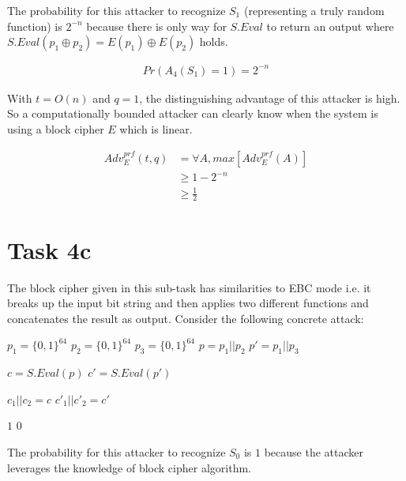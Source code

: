 \documentclass{article}
\begin{document}
    The probability for this attacker to recognize $S_1$ (representing a truly random function) is $2^{-n}$ because there is only way for $S.Eval$ to return an output where $S.Eval(p_1 \oplus p_2) = E(p_1) \oplus E(p_2)$ holds.

    \begin{align*}
        Pr(A_4(S_1) = 1) = 2^{-n}
    \end{align*}

    With $t = O(n)$ and $q = 1$, the distinguishing advantage of this attacker is high. So a computationally bounded attacker can clearly know when the system is using a block cipher $E$ which is linear.

    \begin{align*}
        Adv_E^{prf} (t, q)  & = \forall A, max[ Adv_E^{prf}(A) ] \\
                            & \ge 1 - 2^{-n} \\
                            & \ge \frac{1}{2}
    \end{align*}

    \section*{Task 4c}
    The block cipher given in this sub-task has similarities to EBC mode i.e. it breaks up the input bit string and then applies two different functions and concatenates the result as output. Consider the following concrete attack:

    \begin{algorithm}[H]
        \begin{algorithmic}
                \State $p_1 = \{0, 1\}^{64}$
                \State $p_2 = \{0, 1\}^{64}$
                \State $p_3 = \{0, 1\}^{64}$
                \State $p = p_1 || p_2$
                \State $p' = p_1 || p_3$

                \State $c = S.Eval(p)$
                \State $c' = S.Eval(p')$

                \State $c_1 || c_2 = c$
                \State $c'_1 || c'_2 = c'$

                    \State \Return $1$
                \Else
                    \State \Return $0$
                \EndIf
            \EndProcedure
        \end{algorithmic}
    \end{algorithm}

    The probability for this attacker to recognize $S_0$ is $1$ because the attacker leverages the knowledge of block cipher algorithm.
\end{document}
